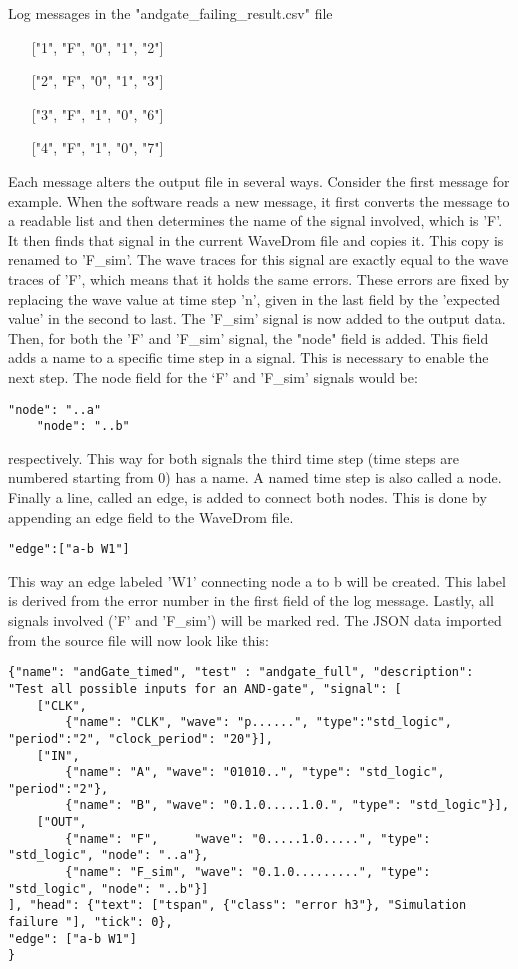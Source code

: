 \begin{customenv}
	\caption{Log messages in the "andgate\_failing\_result.csv" file}
	\begin{itemize}
		\centering
		\item [] ["1", "F", "0", "1", "2"]
		\item [] ["2", "F", "0", "1", "3"]
		\item [] ["3", "F", "1", "0", "6"]
		\item [] ["4", "F", "1", "0", "7"]
	\end{itemize}
\end{customenv}\newpage\noindent
Each message alters the output file in several ways. Consider the first message for example. When the software reads a new message, it first converts the message to a readable list and then determines the name of the signal involved, which is 'F'. It then finds that signal in the current WaveDrom file and copies it. This copy is renamed to 'F\_sim'. The wave traces for this signal are exactly equal to the wave traces of 'F', which means that it holds the same errors. These errors are fixed by replacing the wave value at time step 'n', given in the last field by the 'expected value' in the second to last. The 'F\_sim' signal is now added to the output data. 
\npar
Then, for both the 'F' and 'F\_sim' signal, the "node" field is added. This field adds a name to a specific time step in a signal. This is necessary to enable the next step. The node field for the ‘F’ and 'F\_sim' signals would be:
\begin{lstlisting}[style=json]
	"node": "..a"
	"node": "..b"
\end{lstlisting}\noindent
respectively. This way for both signals the third time step (time steps are numbered starting from 0) has a name. A named time step is also called a node.
\npar
Finally a line, called an edge, is added to connect both nodes. This is done by appending an edge field to the WaveDrom file.
\begin{lstlisting}[style=json]
"edge":["a-b W1"]
\end{lstlisting}\noindent
This way an edge labeled 'W1' connecting node a to b will be created. This label is derived from the error number in the first field of the log message.
\npar
Lastly, all signals involved ('F' and 'F\_sim') will be marked red.
\newpage\noindent
The JSON data imported from the source file will now look like this:
\begin{lstlisting}[style=json, caption={Temporary content of the result file of a failing AND-gate example}, label={json:andgate_failing_part}]
{"name": "andGate_timed", "test" : "andgate_full", "description": "Test all possible inputs for an AND-gate", "signal": [
	["CLK",
		{"name": "CLK", "wave": "p......", "type":"std_logic", "period":"2", "clock_period": "20"}],
	["IN",
		{"name": "A", "wave": "01010..", "type": "std_logic", "period":"2"},
		{"name": "B", "wave": "0.1.0.....1.0.", "type": "std_logic"}],
	["OUT",
		{"name": "F",     "wave": "0.....1.0.....", "type": "std_logic", "node": "..a"},
		{"name": "F_sim", "wave": "0.1.0.........", "type": "std_logic", "node": "..b"}]
], "head": {"text": ["tspan", {"class": "error h3"}, "Simulation failure "], "tick": 0}, 
"edge": ["a-b W1"]
}
\end{lstlisting}\noindent
